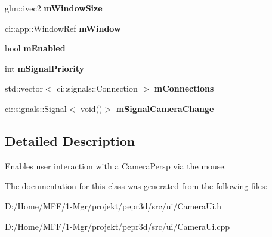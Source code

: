 \begin{DoxyCompactItemize}
glm\+::ivec2 {\bfseries m\+Window\+Size}
\item 
\mbox{\label{classpepr3d_1_1_camera_ui_ac8bbec4806d236ffbf93023759bf45f7}} 
ci\+::app\+::\+Window\+Ref {\bfseries m\+Window}
\item 
\mbox{\label{classpepr3d_1_1_camera_ui_a5bb3fe1a93526c7cea8588b5c69b2662}} 
bool {\bfseries m\+Enabled}
\item 
\mbox{\label{classpepr3d_1_1_camera_ui_a8c4ea34cd4498e6c9b70374b75dbad03}} 
int {\bfseries m\+Signal\+Priority}
\item 
\mbox{\label{classpepr3d_1_1_camera_ui_ae781a9bd952a3e17fbc6ab8f12482a8d}} 
std\+::vector$<$ ci\+::signals\+::\+Connection $>$ {\bfseries m\+Connections}
\item 
\mbox{\label{classpepr3d_1_1_camera_ui_aba0f88d4b2fe1880c087866a62a990fc}} 
ci\+::signals\+::\+Signal$<$ void()$>$ {\bfseries m\+Signal\+Camera\+Change}
\end{DoxyCompactItemize}


\subsection{Detailed Description}
Enables user interaction with a Camera\+Persp via the mouse. 

The documentation for this class was generated from the following files\+:\begin{DoxyCompactItemize}
\item 
D\+:/\+Home/\+M\+F\+F/1-\/\+Mgr/projekt/pepr3d/src/ui/Camera\+Ui.\+h\item 
D\+:/\+Home/\+M\+F\+F/1-\/\+Mgr/projekt/pepr3d/src/ui/Camera\+Ui.\+cpp\end{DoxyCompactItemize}
